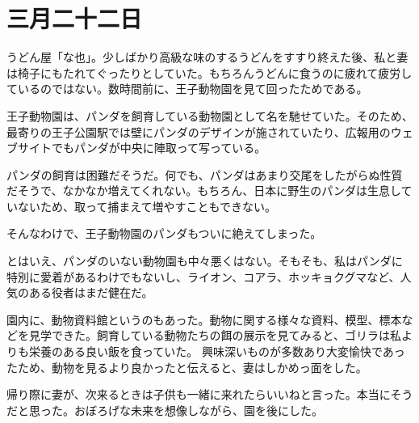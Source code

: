 \chapter{三月二十二日}

うどん屋「な也」。少しばかり高級な味のするうどんをすすり終えた後、私と妻は椅子にもたれてぐったりとしていた。もちろんうどんに食うのに疲れて疲労しているのではない。数時間前に、王子動物園を見て回ったためである。

王子動物園は、パンダを飼育している動物園として名を馳せていた。そのため、最寄りの王子公園駅では壁にパンダのデザインが施されていたり、広報用のウェブサイトでもパンダが中央に陣取って写っている。

パンダの飼育は困難だそうだ。何でも、パンダはあまり交尾をしたがらぬ性質だそうで、なかなか増えてくれない。もちろん、日本に野生のパンダは生息していないため、取って捕まえて増やすこともできない。

そんなわけで、王子動物園のパンダもついに絶えてしまった。

とはいえ、パンダのいない動物園も中々悪くはない。そもそも、私はパンダに特別に愛着があるわけでもないし、ライオン、コアラ、ホッキョクグマなど、人気のある役者はまだ健在だ。

園内に、動物資料館というのもあった。動物に関する様々な資料、模型、標本などを見学できた。飼育している動物たちの餌の展示を見てみると、ゴリラは私よりも栄養のある良い飯を食っていた。
興味深いものが多数あり大変愉快であったため、動物を見るより良かったと伝えると、妻はしかめっ面をした。

帰り際に妻が、次来るときは子供も一緒に来れたらいいねと言った。本当にそうだと思った。おぼろげな未来を想像しながら、園を後にした。



